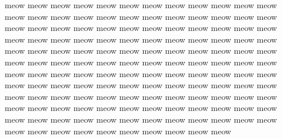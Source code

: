 meow meow meow meow meow meow meow meow meow meow meow meow meow meow meow meow meow meow meow meow meow meow meow meow meow meow meow meow meow meow meow meow meow meow meow meow meow meow meow meow meow meow meow meow meow meow meow meow meow meow meow meow meow meow meow meow meow meow meow meow meow meow meow meow meow meow meow meow meow meow meow meow meow meow meow meow meow meow meow meow meow meow meow meow meow meow meow meow meow meow meow meow meow meow meow meow meow meow meow meow meow meow meow meow meow meow meow meow meow meow meow meow meow meow meow meow meow meow meow meow meow meow meow meow meow meow meow meow meow meow meow meow meow meow meow meow meow meow meow meow meow meow 